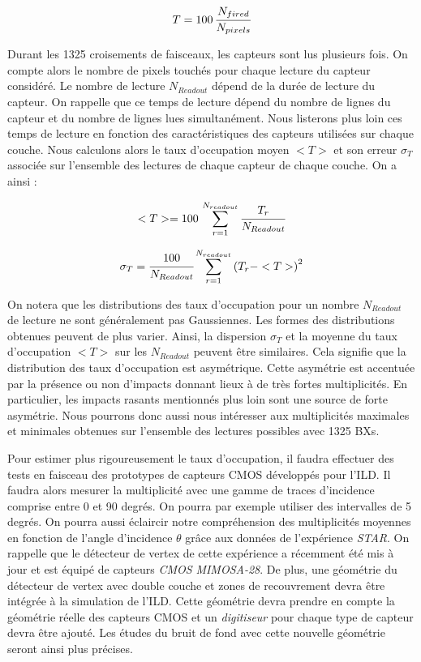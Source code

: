   \begin{equation}
   T = 100 \, \cfrac{ N_{fired} }{ N_{pixels} }
  \end{equation}
  
  Durant les 1325 croisements de faisceaux, les capteurs sont lus plusieurs fois. On compte alors le nombre de pixels touch\'es pour chaque lecture du capteur consid\'er\'e. Le nombre de lecture $N_{Readout}$ d\'epend de la dur\'ee de lecture du capteur. On rappelle que ce temps de lecture d\'epend du nombre de lignes du capteur et du nombre de lignes lues  simultan\'ement. Nous listerons plus loin ces temps de lecture en fonction des caract\'eristiques des capteurs utilis\'ees sur chaque couche. Nous calculons alors le taux d'occupation moyen $<T>$ et son erreur $\sigma_T$ associ\'ee sur l'ensemble des lectures de chaque capteur de chaque couche. On a ainsi :
  
  \begin{equation}
   <T> = 100 \, \sum_{r=1}^{N_{readout}} \cfrac{ T_{r} }{ N_{Readout} }
  \end{equation}

  \begin{equation}
   \sigma_T = \cfrac{ 100 }{ N_{Readout} } \sum_{r=1}^{N_{readout}} \left( T_r - <T> \right)^2 
  \end{equation}
  
  On notera que les distributions des taux d'occupation pour un nombre $N_{Readout}$ de lecture ne sont g\'en\'eralement pas Gaussiennes. Les formes des distributions obtenues peuvent de plus varier. Ainsi, la dispersion $\sigma_T$ et la moyenne du taux d'occupation $<T>$ sur les $N_{Readout}$ peuvent \^etre similaires. Cela signifie que la distribution des taux d'occupation est asym\'etrique. Cette asym\'etrie est accentu\'ee par la pr\'esence ou non d'impacts donnant lieux \`a de tr\`es fortes multiplicit\'es. En particulier, les impacts rasants mentionn\'es plus loin sont une source de forte asym\'etrie. Nous pourrons donc aussi nous int\'eresser aux multiplicit\'es maximales et minimales obtenues sur l'ensemble des lectures possibles avec 1325 BXs.
 
  \medskip

  Pour estimer plus rigoureusement le taux d'occupation, il faudra effectuer des tests en faisceau des prototypes de capteurs CMOS d\'eveloppés pour l'ILD. Il faudra alors mesurer la multiplicit\'e avec une gamme de traces d'incidence comprise entre 0 et 90 degr\'es. On pourra par exemple utiliser des intervalles de 5 degr\'es. On pourra aussi \'eclaircir notre compr\'ehension des multiplicit\'es moyennes en fonction de l'angle d'incidence $\theta$ gr\^ace aux donn\'ees de l'exp\'erience \textit{STAR}. On rappelle que le d\'etecteur de vertex de cette exp\'erience a r\'ecemment \'et\'e mis \`a jour et est \'equipé de capteurs \textit{CMOS} \textit{MIMOSA-28}.  De plus, une g\'eom\'etrie du d\'etecteur de vertex avec double couche et zones de recouvrement devra \^etre int\'egr\'ee \`a la simulation de l'ILD. Cette g\'eom\'etrie devra prendre en compte la g\'eom\'etrie r\'eelle des capteurs CMOS et un \textit{digitiseur} pour chaque type de capteur devra \^etre ajout\'e. Les \'etudes du bruit de fond avec cette nouvelle g\'eom\'etrie seront ainsi plus pr\'ecises.

